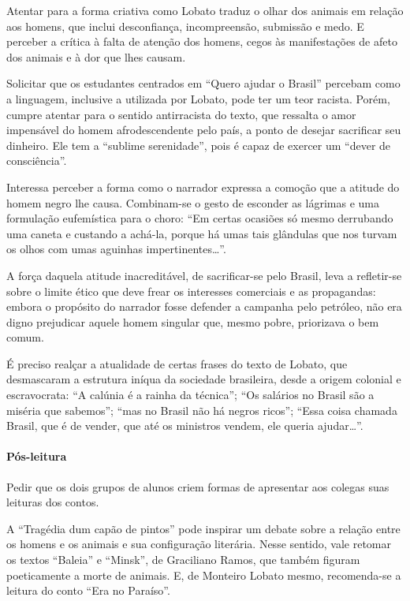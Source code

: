 \documentclass[11pt]{extarticle}
\begin{document}
Atentar para a forma criativa como Lobato traduz o olhar dos animais em
relação aos homens, que inclui desconfiança, incompreensão, submissão e
medo. E perceber a crítica à falta de atenção dos homens, cegos às
manifestações de afeto dos animais e à dor que lhes causam.

Solicitar que os estudantes centrados em ``Quero ajudar o Brasil''
percebam como a linguagem, inclusive a utilizada por Lobato, pode ter um
teor racista. Porém, cumpre atentar para o sentido antirracista do
texto, que ressalta o amor impensável do homem afrodescendente pelo
país, a ponto de desejar sacrificar seu dinheiro. Ele tem a ``sublime
serenidade'', pois é capaz de exercer um ``dever de consciência''.

Interessa perceber a forma como o narrador expressa a comoção que a
atitude do homem negro lhe causa. Combinam-se o gesto de esconder as
lágrimas e uma formulação eufemística para o choro: ``Em certas ocasiões
só mesmo derrubando uma caneta e custando a achá-la, porque há umas tais
glândulas que nos turvam os olhos com umas aguinhas
impertinentes\ldots{}''.

A força daquela atitude inacreditável, de sacrificar-se pelo Brasil,
leva a refletir-se sobre o limite ético que deve frear os interesses
comerciais e as propagandas: embora o propósito do narrador fosse
defender a campanha pelo petróleo, não era digno prejudicar aquele homem
singular que, mesmo pobre, priorizava o bem comum.

É preciso realçar a atualidade de certas frases do texto de Lobato, que
desmascaram a estrutura iníqua da sociedade brasileira, desde a origem
colonial e escravocrata: ``A calúnia é a rainha da técnica''; ``Os
salários no Brasil são a miséria que sabemos''; ``mas no Brasil não há
negros ricos''; ``Essa coisa chamada Brasil, que é de vender, que até os
ministros vendem, ele queria ajudar\ldots{}''.

\asterisc\paragraph{Pós-leitura}

Pedir que os dois grupos de alunos criem formas de apresentar aos
colegas suas leituras dos contos.

A ``Tragédia dum capão de pintos'' pode inspirar um debate sobre a
relação entre os homens e os animais e sua configuração literária. Nesse
sentido, vale retomar os textos ``Baleia'' e ``Minsk'', de Graciliano
Ramos, que também figuram poeticamente a morte de animais. E, de
Monteiro Lobato mesmo, recomenda-se a leitura do conto ``Era no
Paraíso''.
\end{document}

